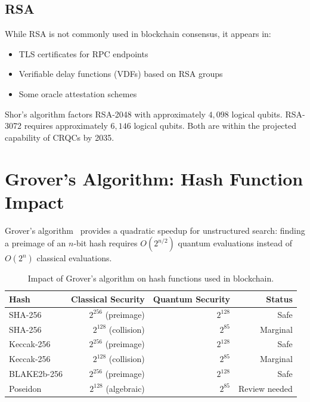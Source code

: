 \documentclass[11pt,a4paper]{article}
\begin{document}
\subsection{RSA}

While RSA is not commonly used in blockchain consensus, it appears in:
\begin{itemize}[leftmargin=2em]
  \item TLS certificates for RPC endpoints
  \item Verifiable delay functions (VDFs) based on RSA groups
  \item Some oracle attestation schemes
\end{itemize}

Shor's algorithm factors RSA-2048 with approximately $4{,}098$ logical qubits.
RSA-3072 requires approximately $6{,}146$ logical qubits. Both are within the
projected capability of CRQCs by 2035.

\section{Grover's Algorithm: Hash Function Impact}
\label{sec:grover}

Grover's algorithm~\cite{grover1996} provides a quadratic speedup for unstructured
search: finding a preimage of an $n$-bit hash requires $O(2^{n/2})$ quantum
evaluations instead of $O(2^n)$ classical evaluations.

\begin{table}[ht]
\centering
\caption{Impact of Grover's algorithm on hash functions used in blockchain.}
\label{tab:grover-impact}
\begin{tabular}{lrrr}
\toprule
\textbf{Hash} & \textbf{Classical Security} & \textbf{Quantum Security} & \textbf{Status} \\
\midrule
SHA-256 & $2^{256}$ (preimage) & $2^{128}$ & Safe \\
SHA-256 & $2^{128}$ (collision) & $2^{85}$ & Marginal \\
Keccak-256 & $2^{256}$ (preimage) & $2^{128}$ & Safe \\
Keccak-256 & $2^{128}$ (collision) & $2^{85}$ & Marginal \\
BLAKE2b-256 & $2^{256}$ (preimage) & $2^{128}$ & Safe \\
Poseidon & $2^{128}$ (algebraic) & $2^{85}$ & Review needed \\
\bottomrule
\end{tabular}
\end{table}
\end{document}

